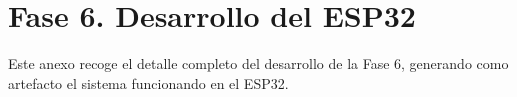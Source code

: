 \documentclass[../main.tex]{subfiles}
\begin{document}
	\chapter{Fase 6. Desarrollo del ESP32}
	\label{sec:DerarrolloFase6}
	
	Este anexo recoge el detalle completo del desarrollo de la Fase 6, generando como artefacto el sistema funcionando en el ESP32.
	
	
	\clearpage
		
		
	
	

		
	
	
\end{document}
